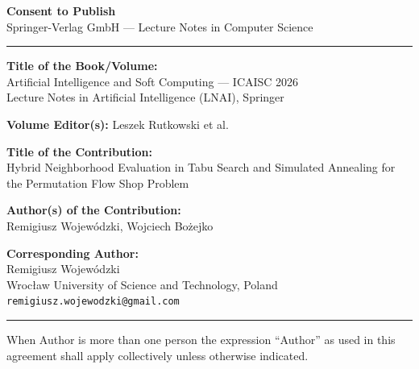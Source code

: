 \documentclass[11pt]{article}
\begin{document}
\begin{center}
{\Large\bfseries Consent to Publish}\\[4pt]
{\large Springer-Verlag GmbH — Lecture Notes in Computer Science}\\[12pt]
\end{center}

\hrule
\vspace{8pt}

\textbf{Title of the Book/Volume:}\\
Artificial Intelligence and Soft Computing --- ICAISC 2026\\
Lecture Notes in Artificial Intelligence (LNAI), Springer

\vspace{6pt}
\textbf{Volume Editor(s):} Leszek Rutkowski et al.

\vspace{6pt}
\textbf{Title of the Contribution:}\\
Hybrid Neighborhood Evaluation in Tabu Search and Simulated Annealing for the Permutation Flow Shop Problem

\vspace{6pt}
\textbf{Author(s) of the Contribution:}\\
Remigiusz Wojew\'{o}dzki, Wojciech Bo\.{z}ejko

\vspace{6pt}
\textbf{Corresponding Author:}\\
Remigiusz Wojew\'{o}dzki\\
Wroc{\l}aw University of Science and Technology, Poland\\
\texttt{remigiusz.wojewodzki@gmail.com}

\vspace{12pt}
\hrule
\vspace{12pt}

When Author is more than one person the expression ``Author'' as used in this
agreement shall apply collectively unless otherwise indicated.
\end{document}
